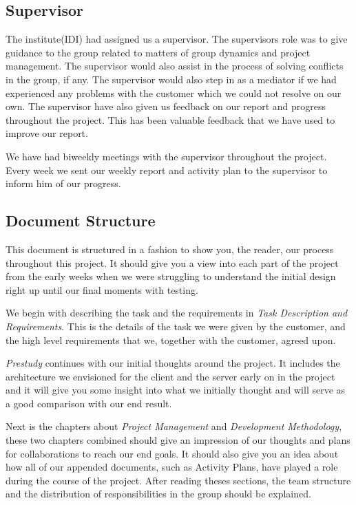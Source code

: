     
    \subsection{Supervisor}\label{Supervisor}
    
    The institute(IDI) had assigned us a supervisor. The supervisors role was to give guidance to the group related to matters of group dynamics and project management. The supervisor would also assist in the process of solving conflicts in the group, if any. The supervisor would also step in as a mediator if we had experienced any problems with the customer which we could not resolve on our own. The supervisor have also given us feedback on our report and progress throughout the project. This has been valuable feedback that we have used to improve our report.  
    
    We have had biweekly meetings with the supervisor throughout the project. Every week we sent our weekly report and activity plan to the supervisor to inform him of our progress. 
    
    
    \subsection{Document Structure}\label{Document Structure}
    This document is structured in a fashion to show you, the reader, our process throughout this project. It should give you a view into each part of the project from the early weeks when we were struggling to understand the initial design right up until our final moments with testing. 
    
    We begin with describing the task and the requirements in \emph{Task Description and Requirements}. This is the details of the task we were given by the customer, and the high level requirements that we, together with the customer, agreed upon.
    
    \emph{Prestudy} continues with our initial thoughts around the project. It includes the architecture we envisioned for the client and the server early on in the project and it will give you some insight into what we initially thought and will serve as a good comparison with our end result.
    
    Next is the chapters about \emph{Project Management} and \emph{Development Methodology}, these two chapters combined should give an impression of our thoughts and plans for collaborations to reach our end goals. It should also give you an idea about how all of our appended documents, such as Activity Plans, have played a role during the course of the project. After reading theses sections, the team structure and the distribution of responsibilities in the group should be explained.
    
